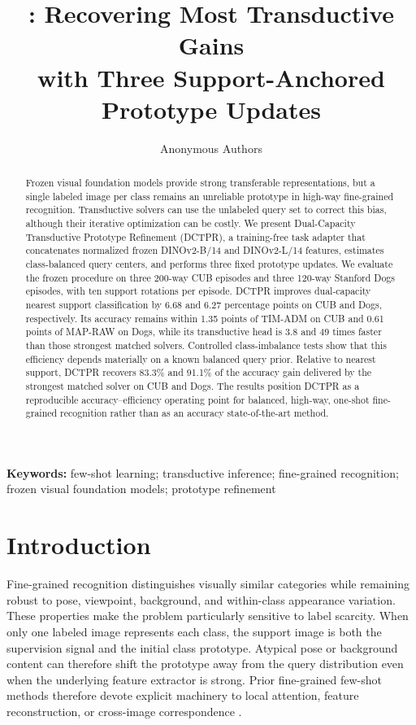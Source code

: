 \documentclass[10pt,twocolumn]{article}
\title{\method: Recovering Most Transductive Gains\\
with Three Support-Anchored Prototype Updates}
\author{Anonymous Authors}
\date{}
\newcommand{\method}{\textsc{DCTPR}\xspace}
\begin{document}
\maketitle

\begin{abstract}
Frozen visual foundation models provide strong transferable representations,
but a single labeled image per class remains an unreliable prototype in
high-way fine-grained recognition. Transductive solvers can use the unlabeled
query set to correct this bias, although their iterative optimization can be
costly. We present Dual-Capacity Transductive Prototype Refinement
(\method), a training-free task adapter that concatenates normalized frozen
DINOv2-B/14 and DINOv2-L/14 features, estimates class-balanced query centers,
and performs three fixed prototype updates. We evaluate the frozen procedure
on three 200-way CUB episodes and three 120-way Stanford Dogs episodes, with
ten support rotations per episode. \method improves dual-capacity nearest
support classification by 6.68 and 6.27 percentage points on CUB and Dogs,
respectively. Its accuracy remains within 1.35 points of TIM-ADM on CUB and
0.61 points of MAP-RAW on Dogs, while its transductive head is 3.8 and 49 times
faster than those strongest matched solvers. Controlled class-imbalance tests
show that this efficiency depends materially on a known balanced query prior.
Relative to nearest support, \method recovers 83.3\% and 91.1\% of the accuracy
gain delivered by the strongest matched solver on CUB and Dogs. The results
position \method as a reproducible accuracy--efficiency operating point for
balanced, high-way, one-shot fine-grained recognition rather than as an
accuracy state-of-the-art method.
\end{abstract}

\noindent\textbf{Keywords:} few-shot learning; transductive inference;
fine-grained recognition; frozen visual foundation models; prototype refinement

\section{Introduction}
\label{sec:introduction}

Fine-grained recognition distinguishes visually similar categories while
remaining robust to pose, viewpoint, background, and within-class appearance
variation. These properties make the problem particularly sensitive to label
scarcity. When only one labeled image represents each class, the support image
is both the supervision signal and the initial class prototype. Atypical pose or
background content can therefore shift the prototype away from the query
distribution even when the underlying feature extractor is strong. Prior
fine-grained few-shot methods therefore devote explicit machinery to local
attention, feature reconstruction, or cross-image correspondence
\cite{mamlfgvc,dualattention,bfrn}.
\end{document}
